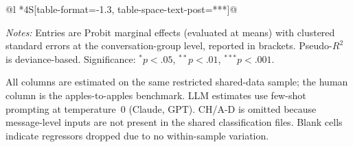 \begin{table}[!htbp]
\begin{threeparttable}
\begin{tabular}{@{}l
  *{4}{S[table-format=-1.3, table-space-text-post={***}]}@{}}
\bottomrule
\end{tabular}
\begin{minipage}{\textwidth}
\begin{tablenotes}[flushleft]
\scriptsize
\item \textit{Notes:} Entries are Probit marginal effects (evaluated at means) with clustered standard errors at the conversation-group level, reported in brackets. Pseudo-$R^2$ is deviance-based. Significance: $^{*}p<.05$, $^{**}p<.01$, $^{***}p<.001$.
\item All columns are estimated on the same restricted shared-data sample; the human column is the apples-to-apples benchmark. LLM estimates use few-shot prompting at temperature~0 (Claude, GPT). CH/A-D is omitted because message-level inputs are not present in the shared classification files. Blank cells indicate regressors dropped due to no within-sample variation.
\end{tablenotes}
\end{minipage}
\end{threeparttable}
\end{table}

